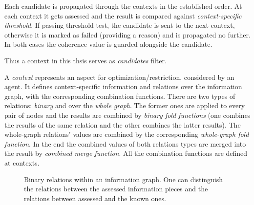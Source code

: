 Each candidate is propagated through the contexts in the established
order. At each context it gets assessed and the result is compared
against \emph{context-specific threshold}. If passing threshold test,
the candidate is sent to the next context, otherwise it is marked as failed
(providing a reason) and is propagated no further. In both cases the coherence
value is guarded alongside the candidate.

Thus a context in this thsis serves as \emph{candidates} filter.
\medskip

\noindent
A \emph{context} represents an aspect for optimization/restriction, considered
by an agent. It defines context-specific information and relations over the
information graph, with the corresponding combination functions. There are
two types of relations: \emph{binary} and over the \emph{whole graph}. The former ones
are applied to every pair of nodes and the results are combined by
\emph{binary fold functions} (one combines the results of the same relation
and the other combines the latter results). The whole-graph relations' values are
combined by the corresponding \emph{whole-graph fold function}. In the end the
combined values of both relations types are merged into the result by
\emph{combined merge function}. All the combination functions are defined at
contexts.

\begin{figure}[h]
  \centering
  \fbox{  }
  \caption{Binary relations within an information graph. One can
           distinguish the relations between the assessed information pieces
           and the relations between assessed and the known ones.
          }
\end{figure}




%
